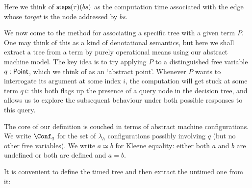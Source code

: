 \documentclass[12pt,phd,lfcs,twoside,openright,logo,leftchapter,normalheadings]{infthesis}
\theoremstyle{plain}
\theoremstyle{definition}
\begin{document}
Here we think of $\mathsf{steps}(\tau)(bs)$ as the computation time
associated with the edge whose \emph{target} is the node addressed by
$bs$.

We now come to the method for associating a specific tree with a given
term $P$. One may think of this as a kind of denotational semantics,
but here we shall extract a tree from a term by purely operational
means using our abstract machine model. The key idea is to try
applying $P$ to a distinguished free variable $q: \mathsf{Point}$, which we
think of as an `abstract point'. Whenever $P$ wants to interrogate its
argument at some index $i$, the computation will get stuck at some
term $q\,i$: this both flags up the presence of a query node in the
decision tree, and allows us to explore the subsequent behaviour under
both possible responses to this query.

The core of our definition is couched in terms of abstract machine configurations.
We write $\Conf_q$ for the set of $\lambda_h$ configurations possibly involving $q$
(but no other free variables).
We write $a \simeq b$ for Kleene equality: either both $a$ and $b$ are
undefined or both are defined and $a = b$.

It is convenient to define the timed tree and then extract the untimed one from it:
\end{document}
